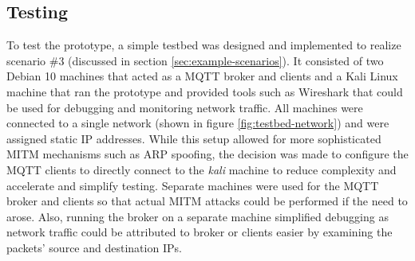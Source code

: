 \subsection{Testing}
\label{sec:prototype-testing}
To test the prototype, a simple testbed was designed and implemented to realize scenario \#3 (discussed in section \ref{sec:example-scenarios}). It consisted of two Debian 10 machines that acted as a \ac{MQTT} broker and clients and a Kali Linux machine that ran the prototype and provided tools such as Wireshark that could be used for debugging and monitoring network traffic. All machines were connected to a single network (shown in figure \ref{fig:testbed-network}) and were assigned static \ac{IP} addresses. While this setup allowed for more sophisticated \ac{MITM} mechanisms such as \ac{ARP} spoofing, the decision was made to configure the \ac{MQTT} clients to directly connect to the \emph{kali} machine to reduce complexity and accelerate and simplify testing. Separate machines were used for the \ac{MQTT} broker and clients so that actual \ac{MITM} attacks could be performed if the need to arose. Also, running the broker on a separate machine simplified debugging as network traffic could be attributed to broker or clients easier by examining the packets' source and destination \acp{IP}.\par

